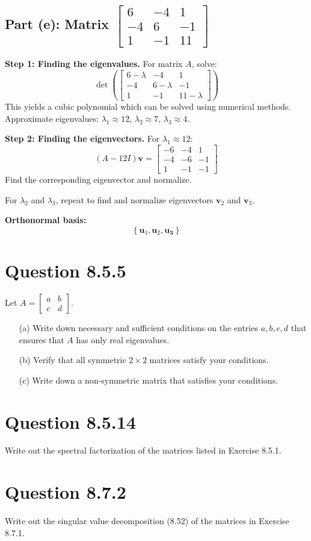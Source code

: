 \documentclass[12pt]{article}
\begin{document}
\subsection*{Part (e): Matrix \( \begin{bmatrix} 6 & -4 & 1 \\ -4 & 6 & -1 \\ 1 & -1 & 11 \end{bmatrix} \)}
\textbf{Step 1: Finding the eigenvalues.}
For matrix \(A\), solve:
\[
\det\left( \begin{bmatrix} 6 - \lambda & -4 & 1 \\ -4 & 6 - \lambda & -1 \\ 1 & -1 & 11 - \lambda \end{bmatrix} \right)
\]
This yields a cubic polynomial which can be solved using numerical methods. Approximate eigenvalues: \(\lambda_1 \approx 12\), \(\lambda_2 \approx 7\), \(\lambda_3 \approx 4\).

\textbf{Step 2: Finding the eigenvectors.}
For \(\lambda_1 \approx 12\):
\[
(A - 12I)\mathbf{v} = \begin{bmatrix} -6 & -4 & 1 \\ -4 & -6 & -1 \\ 1 & -1 & -1 \end{bmatrix}
\]
Find the corresponding eigenvector and normalize.

For \(\lambda_2\) and \(\lambda_3\), repeat to find and normalize eigenvectors \(\mathbf{v}_2\) and \(\mathbf{v}_3\).

\textbf{Orthonormal basis:}
\[
\left\{ \mathbf{u}_1, \mathbf{u}_2, \mathbf{u_3} \right\}
\]


\section*{Question 8.5.5}
Let \( A = \begin{bmatrix} a & b \\ c & d \end{bmatrix} \). 
\begin{itemize}
    \item[(a)] Write down necessary and sufficient conditions on the entries \( a, b, c, d \) that ensures that \( A \) has only real eigenvalues.
    \item[(b)] Verify that all symmetric \( 2 \times 2 \) matrices satisfy your conditions.
    \item[(c)] Write down a non-symmetric matrix that satisfies your conditions.
\end{itemize}

\section*{Question 8.5.14}
Write out the spectral factorization of the matrices listed in Exercise 8.5.1.

\section*{Question 8.7.2}
Write out the singular value decomposition (8.52) of the matrices in Exercise 8.7.1.
\end{document}
